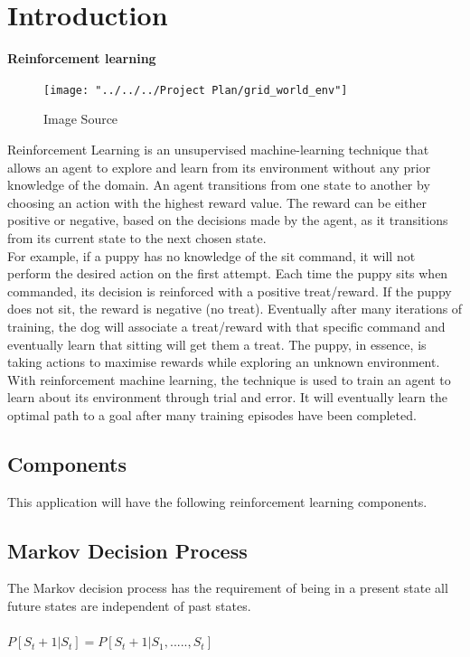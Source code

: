 \chapter{Introduction}
\textbf{Reinforcement learning}\\
\begin{figure}[H]
	\centering
	\texttt{[image: "../../../Project Plan/grid\_world\_env"]}
	\caption{Image Source~\cite{GridWorl45:online}}
	\label{fig:gridworldenv}

\end{figure}
Reinforcement Learning is an unsupervised machine-learning technique that allows an agent to explore and learn from its environment without any prior knowledge of the domain. 
An agent transitions from one state to another by choosing an action with the highest reward value. The reward can be either positive or negative, based on the decisions made by the agent, as it transitions from its current state to the next chosen state.\\
For example, if a puppy has no knowledge of the sit command, it will not perform the desired action on the first attempt. Each time the puppy sits when commanded, its decision is reinforced with a positive treat/reward. If the puppy does not sit, the reward is negative (no treat). Eventually after many iterations of training, the dog will associate a treat/reward with that specific command and eventually learn that sitting will get them a treat. 
The puppy, in essence, is taking actions to maximise rewards while exploring an unknown environment.\\
With reinforcement machine learning, the technique is used to train an agent to learn about its environment through trial and error. It will eventually learn the optimal path to a goal after many training episodes have been completed.

\section{Components}
This application will have the following reinforcement learning components.

\section{Markov Decision Process}
The Markov decision process has the requirement of being in a present state all future states are independent of past states.\\\\
$P[S_{t}+1 | S_{t}] = P[S_{t}+1 | S_{1}, ..... , S_{t}]$\\\\

